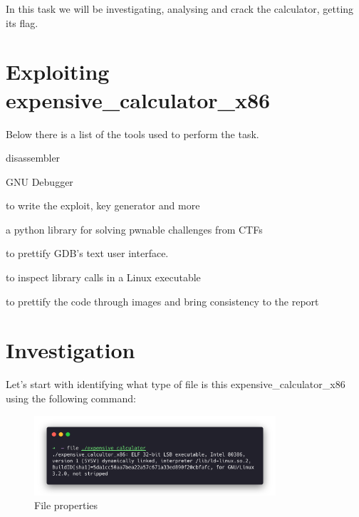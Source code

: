 In this task we will be investigating, analysing and crack the calculator,
getting its flag.

\section{Exploiting expensive\_calculator\_x86}
\label{s:exploiting}

Below there is a list of the tools used to perform the task.

\begin{description}[align=left]
  \item [Tools Used]
  \item [IDA:] disassembler
  \item [GDB version:] GNU Debugger
  \item [Python:] to write the exploit, key generator and more
  \item [PwnTools:] a python library for solving pwnable challenges from CTFs
  \item [GEF:] to prettify GDB's text user interface.
  \item [ltrace:] to inspect library calls in a Linux executable
  \item [carbon:] to prettify the code through images and bring consistency to
  the report
\end{description}

\section{Investigation}
\label{s:investigation}

Let's start with identifying what type of file is this
expensive\_calculator\_x86 using the following command:
\begin{figure}[H]
  \centering
  \includegraphics[width=0.8\textwidth]{figures/file_expensive}
  \caption{File properties}
  \label{f:file_expensive}
\end{figure}

